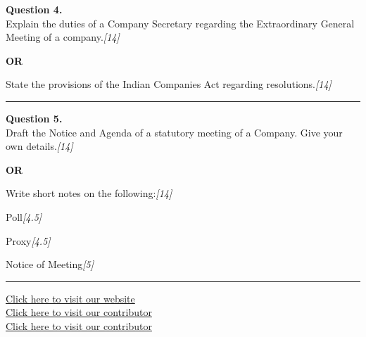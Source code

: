 \documentclass[11pt,a4paper]{article}
\newcommand{\pts}[1]{\hfill   \textit{[#1]}}
\begin{document}
\noindent   \textbf{Question 4.} \\
Explain the duties of a Company Secretary regarding the Extraordinary General Meeting of a company.\pts{14}

\centerline{   \textbf{OR}}

State the provisions of the Indian Companies Act regarding resolutions.\pts{14}

\medskip\rule{\linewidth}{0.2pt}




\noindent   \textbf{Question 5.} \\
Draft the Notice and Agenda of a statutory meeting of a Company. Give your own details.\pts{14}

\centerline{   \textbf{OR}}

Write short notes on the following:\pts{14}

\begin{parts}
  \item Poll\pts{4.5}
  \item Proxy\pts{4.5}
  \item Notice of Meeting\pts{5}
\end{parts}

\vfill
\rule{\linewidth}{0.4pt}

\begin{center}\small
\href{https://bhu-exam.vercel.app/}{Click here to visit our website}\\[4pt]
\href{https://me-aryan.vercel.app/}{Click here to visit our contributor}\\[4pt]
\href{https://quashan-me.vercel.app/}{Click here to visit our contributor}
\end{center}
\end{document}
